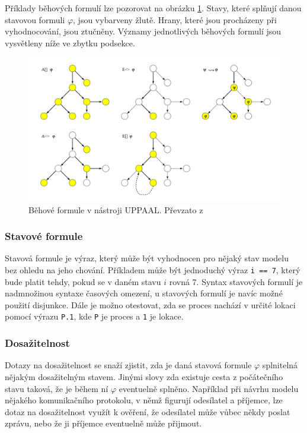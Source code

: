 Příklady běhových formulí lze pozorovat na obrázku \ref{fig:uppaal_path_form}. Stavy, které splňují danou stavovou formuli $\varphi$, jsou vybarveny žlutě. Hrany, které jsou procházeny při vyhodnocování, jsou ztučněny. Významy jednotlivých běhových formulí jsou vysvětleny níže ve zbytku podsekce.

\begin{figure}[H]
    \centering
    \includegraphics[width=\textwidth]{obrazky-figures/uppaal_path_form.png}
    \caption{Běhové formule v nástroji UPPAAL. Převzato z \cite{uppaal_intro}}
    \label{fig:uppaal_path_form}
\end{figure}

\subsubsection{Stavové formule}
Stavová formule je výraz, který může být vyhodnocen pro nějaký stav modelu bez ohledu na jeho chování. Příkladem může být jednoduchý výraz \texttt{i == 7}, který bude platit tehdy, pokud se v daném stavu $i$ rovná 7. Syntax stavových formulí je nadmnožinou syntaxe časových omezení, u stavových formulí je navíc možné použití disjunkce. Dále je možno otestovat, zda se proces nachází v určité lokaci pomocí výrazu \texttt{P.1}, kde \texttt{P} je proces a \texttt{1} je lokace.

\subsubsection{Dosažitelnost}
Dotazy na dosažitelnost se snaží zjistit, zda je daná stavová formule $\varphi$ splnitelná nějakým dosažitelným stavem. Jinými slovy zda existuje cesta z počátečního stavu taková, že je během ní $\varphi$ eventuelně splněno. Například při návrhu modelu nějakého komunikačního protokolu, v němž figurují odesílatel a příjemce, lze dotaz na dosažitelnost využít k ověření, že odesílatel může vůbec někdy poslat zprávu, nebo že ji příjemce eventuelně může přijmout.

